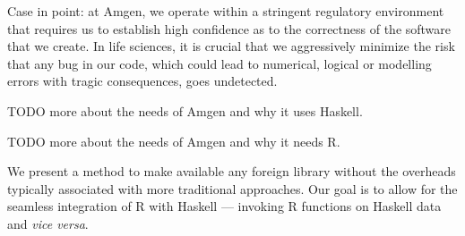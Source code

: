 \documentclass[preprint,authoryear]{sigplanconf}
\begin{document}
Case in point: at Amgen, we operate within a stringent regulatory
environment that requires us to establish high confidence as to the
correctness of the software that we create. In life sciences, it is
crucial that we aggressively minimize the risk that any bug in our
code, which could lead to numerical, logical or modelling errors with
tragic consequences, goes undetected.

TODO more about the needs of Amgen and why it uses Haskell.

TODO more about the needs of Amgen and why it needs R.


We present a method to make available any foreign library without the
overheads typically associated with more traditional approaches. Our
goal is to allow for the seamless integration of R with Haskell ---
invoking R functions on Haskell data and {\em vice versa}.
\end{document}
